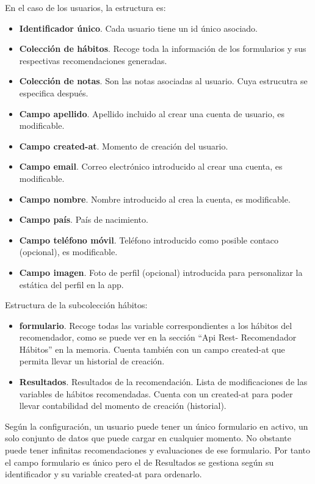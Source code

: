 En el caso de los usuarios, la estructura es:
\begin{itemize}
    \item \textbf{Identificador único}. Cada usuario tiene un id único asociado.
    \item \textbf{Colección de hábitos}. Recoge toda la información de los formularios y sus respectivas recomendaciones generadas.
    \item \textbf{Colección de notas}. Son las notas asociadas al usuario. Cuya estrucutra se especifica después.
    \item \textbf{Campo apellido}. Apellido incluido al crear una cuenta de usuario, es modificable.
    \item \textbf{Campo created-at}. Momento de creación del usuario.
    \item \textbf{Campo email}. Correo electrónico introducido al crear una cuenta, es modificable.
    \item \textbf{Campo nombre}. Nombre introducido al crea la cuenta, es modificable.
    \item \textbf{Campo país}. País de nacimiento.
    \item \textbf{Campo teléfono móvil}. Teléfono introducido como posible contaco (opcional), es modificable.
    \item \textbf{Campo imagen}. Foto de perfil (opcional) introducida para personalizar la estática del perfil en la app.
\end{itemize}

Estructura de la subcolección hábitos:
\begin{itemize}
    \item \textbf{formulario}. Recoge todas las variable correspondientes a los hábitos del recomendador, como se puede ver en la sección ``Api Rest- Recomendador Hábitos'' en la memoria. Cuenta también con un campo created-at que permita llevar un historial de creación.
    \item \textbf{Resultados}. Resultados de la recomendación. Lista de modificaciones de las variables de hábitos recomendadas. Cuenta con un created-at para poder llevar contabilidad del momento de creación (historial).
\end{itemize}
Según la configuración, un usuario puede tener un único formulario en activo, un solo conjunto de datos que puede cargar en cualquier momento. No obstante puede tener infinitas recomendaciones y evaluaciones de ese formulario. Por tanto el campo formulario es único pero el de Resultados se gestiona según su identificador y su variable created-at para ordenarlo.

